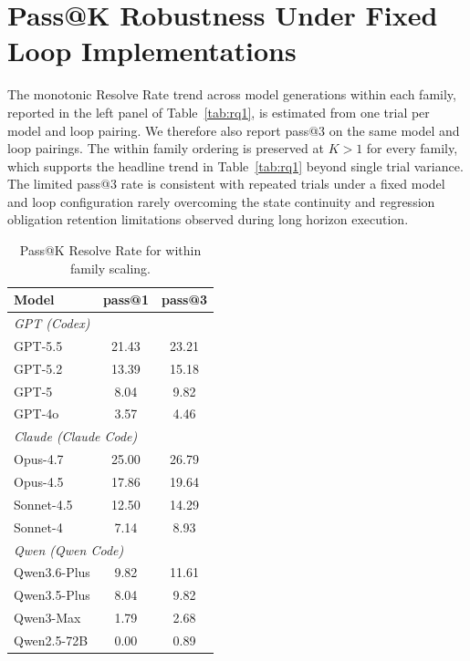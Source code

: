 \section{Pass@K Robustness Under Fixed Loop Implementations}\label{app:passk}

The monotonic Resolve Rate trend across model generations within each family, reported in the left panel of Table~\ref{tab:rq1}, is estimated from one trial per model and loop pairing. We therefore also report pass@3 on the same model and loop pairings. The within family ordering is preserved at $K{>}1$ for every family, which supports the headline trend in Table~\ref{tab:rq1} beyond single trial variance. The limited pass@3 rate is consistent with repeated trials under a fixed model and loop configuration rarely overcoming the state continuity and regression obligation retention limitations observed during long horizon execution.

\begin{table}[h]
  \centering
  \small
  \caption{Pass@K Resolve Rate for within family scaling.}
  \label{tab:passk}
  \begin{tabular}{l cc}
    \toprule
    \textbf{Model} & \textbf{pass@1} & \textbf{pass@3} \\
    \midrule
    \multicolumn{3}{l}{\emph{GPT (Codex)}} \\
    GPT-5.5      & 21.43 & 23.21 \\
    GPT-5.2      & 13.39 & 15.18 \\
    GPT-5        & 8.04  & 9.82  \\
    GPT-4o       & 3.57  & 4.46  \\
    \midrule
    \multicolumn{3}{l}{\emph{Claude (Claude Code)}} \\
    Opus-4.7     & 25.00 & 26.79 \\
    Opus-4.5     & 17.86 & 19.64 \\
    Sonnet-4.5   & 12.50 & 14.29 \\
    Sonnet-4     & 7.14  & 8.93  \\
    \midrule
    \multicolumn{3}{l}{\emph{Qwen (Qwen Code)}} \\
    Qwen3.6-Plus & 9.82  & 11.61 \\
    Qwen3.5-Plus & 8.04  & 9.82  \\
    Qwen3-Max    & 1.79  & 2.68  \\
    Qwen2.5-72B  & 0.00  & 0.89  \\
    \bottomrule
  \end{tabular}
\end{table}
